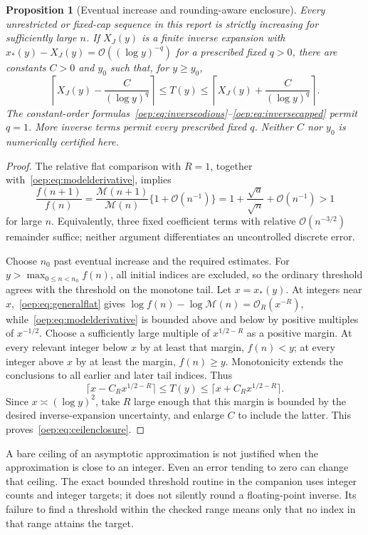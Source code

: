 \documentclass[11pt,letterpaper]{article}
\newtheorem{proposition}[theorem]{Proposition}
\theoremstyle{remark}\newtheorem{remark}[theorem]{Remark}
\newcommand{\calM}{\mathcal M}
\newcommand{\OO}{\mathcal O}
\begin{document}
\begin{proposition}[Eventual increase and rounding-aware enclosure]\label{oep:prop:threshold}
Every unrestricted or fixed-cap sequence in this report is strictly increasing for sufficiently large $n$. If $X_J(y)$ is a finite inverse expansion with
$x_*(y)-X_J(y)=\OO((\log y)^{-q})$ for a prescribed fixed $q>0$, there are constants $C>0$ and $y_0$ such that, for $y\geq y_0$,
\begin{equation}\label{oep:eq:ceilenclosure}
 \left\lceil X_J(y)-\frac{C}{(\log y)^q}\right\rceil
 \leq T(y)\leq
 \left\lceil X_J(y)+\frac{C}{(\log y)^q}\right\rceil.
\end{equation}
The constant-order formulas~\eqref{oep:eq:inverseodious}--\eqref{oep:eq:inversecapped} permit $q=1$. More inverse terms permit every prescribed fixed $q$. Neither $C$ nor $y_0$ is numerically certified here.
\end{proposition}
\begin{proof}
The relative flat comparison with $R=1$, together with~\eqref{oep:eq:modelderivative}, implies
\[
 \frac{f(n+1)}{f(n)}
 =\frac{\calM(n+1)}{\calM(n)}\{1+\OO(n^{-1})\}
 =1+\frac{\sqrt a}{\sqrt n}+\OO(n^{-1})>1
\]
for large $n$. Equivalently, three fixed coefficient terms with relative $\OO(n^{-3/2})$ remainder suffice; neither argument differentiates an uncontrolled discrete error.

Choose $n_0$ past eventual increase and the required estimates. For $y>\max_{0\leq n<n_0}f(n)$, all initial indices are excluded, so the ordinary threshold agrees with the threshold on the monotone tail. Let $x=x_*(y)$. At integers near $x$,~\eqref{oep:eq:generalflat} gives
$\log f(n)-\log\calM(n)=\OO_R(x^{-R})$, while~\eqref{oep:eq:modelderivative} is bounded above and below by positive multiples of $x^{-1/2}$. Choose a sufficiently large multiple of $x^{1/2-R}$ as a positive margin. At every relevant integer below $x$ by at least that margin, $f(n)<y$; at every integer above $x$ by at least the margin, $f(n)\geq y$. Monotonicity extends the conclusions to all earlier and later tail indices. Thus
\[
 \lceil x-C_Rx^{1/2-R}\rceil\leq T(y)
     \leq\lceil x+C_Rx^{1/2-R}\rceil.
\]
Since $x\asymp(\log y)^2$, take $R$ large enough that this margin is bounded by the desired inverse-expansion uncertainty, and enlarge $C$ to include the latter. This proves~\eqref{oep:eq:ceilenclosure}.
\end{proof}
A bare ceiling of an asymptotic approximation is not justified when the approximation is close to an integer. Even an error tending to zero can change that ceiling. The exact bounded threshold routine in the companion uses integer counts and integer targets; it does not silently round a floating-point inverse. Its failure to find a threshold within the checked range means only that no index in that range attains the target.
\end{document}
